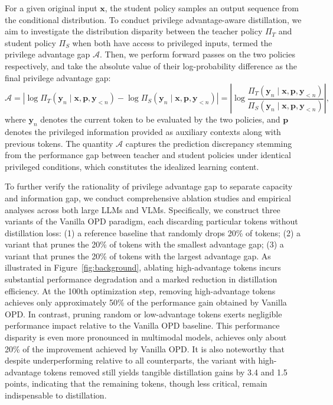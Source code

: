 \documentclass[]{jingdong}
\theoremstyle{plain}
\theoremstyle{definition}
\theoremstyle{remark}
\begin{document}
For a given original input $\mathbf{x}$, the student policy samples an output sequence from the conditional distribution. 
To conduct privilege advantage-aware distillation, we aim to investigate the distribution disparity between the teacher policy $\Pi_{T}$ and student policy $\Pi_{S}$ when both have access to privileged inputs, termed the privilege advantage gap $\mathcal{A}$. Then, we perform forward passes on the two policies respectively, and take the absolute value of their log-probability difference as the final privilege advantage gap:
\begin{equation}
    \mathcal{A} = | \log \Pi_{T} \left(\mathbf{y}_{n} \mid \mathbf{x} , \mathbf{p} , \mathbf{y}_{<n}\right)-\log \Pi_{S}\left(\mathbf{y}_{n} \mid \mathbf{x}, \mathbf{p}, \mathbf{y}_{<n}\right)| = \left|\log\frac{  \Pi_{T} \left(\mathbf{y}_{n} \mid \mathbf{x} , \mathbf{p} , \mathbf{y}_{<n}\right)}{ \Pi_{S}\left(\mathbf{y}_{n} \mid \mathbf{x}, \mathbf{p}, \mathbf{y}_{<n}\right)}\right|,
    \label{eq:advantage_gap}
\end{equation}
where $\mathbf{y}_{n}$ denotes the current token to be evaluated by the two policies, and $\mathbf{p}$ denotes the privileged information provided as auxiliary contexts along with previous tokens. 
The quantity $\mathcal{A}$ captures the prediction discrepancy stemming from the performance gap between teacher and student policies under identical privileged conditions, which constitutes the idealized learning content.


To further verify the rationality of privilege advantage gap to separate capacity and information gap, we conduct comprehensive ablation studies and empirical analyses across both large LLMs and VLMs. Specifically, we construct three variants of the Vanilla OPD paradigm, each discarding particular tokens without distillation loss: (1) a reference baseline that randomly drops 20\% of tokens; (2) a variant that prunes the 20\% of tokens with the smallest advantage gap; (3) a variant that prunes the 20\% of tokens with the largest advantage gap.
As illustrated in Figure~\ref{fig:background}, ablating high-advantage tokens incurs substantial performance degradation and a marked reduction in distillation efficiency. At the 100th optimization step, removing high-advantage tokens achieves only approximately 50\% of the performance gain obtained by Vanilla OPD. In contrast, pruning random or low-advantage tokens exerts negligible performance impact relative to the Vanilla OPD baseline. This performance disparity is even more pronounced in multimodal models, achieves only about 20\% of the improvement achieved by Vanilla OPD. It is also noteworthy that despite underperforming relative to all counterparts, the variant with high-advantage tokens removed still yields tangible distillation gains by 3.4 and 1.5 points, indicating that the remaining tokens, though less critical, remain indispensable to distillation.
\end{document}
